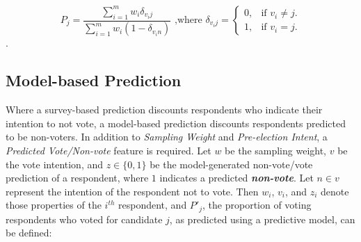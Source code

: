 \documentclass{article}
\begin{document}
	\begin{equation}
	P_j = \dfrac{\sum_{i=1}^m w_i \delta_{v_ij}}{\sum_{i=1}^m w_i (1 - \delta_{v_in})} \textrm{ ,where }
	\delta_{v_ij} = \begin{cases}
	0, & \text{if $v_i \neq j$}.\\
	1, & \text{if $v_i = j$}.
	\end{cases}
	\end{equation}.
	
	\subsection{Model-based Prediction}
	
	Where a survey-based prediction discounts respondents who indicate their intention to not vote, a model-based prediction discounts respondents predicted to be non-voters.  In addition to \textit{Sampling Weight} and \textit{Pre-election Intent}, a \textit{Predicted Vote/Non-vote} feature is required. Let $w$ be the sampling weight, $v$ be the vote intention, and $z \in \{0, 1\}$ be the model-generated non-vote/vote prediction of a respondent, where $1$ indicates a predicted \textbf{\textit{non-vote}}. Let $n \in v$ represent the intention of the respondent not to vote. Then $w_i$, $v_i$, and $z_i$ denote those properties of the $i^{th}$ respondent, and $P'_j$, the proportion of voting respondents who voted for candidate $j$, as predicted using a predictive model, can be defined:
	
\end{document}
